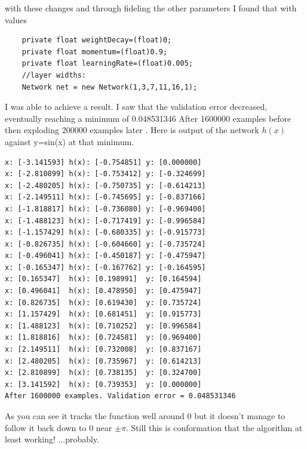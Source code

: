 \documentclass[11pt]{article} %
\begin{document}
with these changes and through fideling the other parameters I found that with values
\begin{lstlisting}
    private float weightDecay=(float)0;
    private float momentum=(float)0.9;
    private float learningRate=(float)0.005;
    //layer widths:
    Network net = new Network(1,3,7,11,16,1);
\end{lstlisting}
I was able to achieve a result. I saw that the validation error decreased, eventually reaching a minimum of 0.048531346 After 1600000 examples before then exploding 200000 examples later . Here is output of the network $h(x)$ against y=sin(x) at that minimum.
\begin{lstlisting}
x: [-3.141593] h(x): [-0.754851] y: [0.000000]
x: [-2.810899] h(x): [-0.753412] y: [-0.324699]
x: [-2.480205] h(x): [-0.750735] y: [-0.614213]
x: [-2.149511] h(x): [-0.745695] y: [-0.837166]
x: [-1.818817] h(x): [-0.736080] y: [-0.969400]
x: [-1.488123] h(x): [-0.717419] y: [-0.996584]
x: [-1.157429] h(x): [-0.680335] y: [-0.915773]
x: [-0.826735] h(x): [-0.604660] y: [-0.735724]
x: [-0.496041] h(x): [-0.450187] y: [-0.475947]
x: [-0.165347] h(x): [-0.167762] y: [-0.164595]
x: [0.165347]  h(x): [0.198991]  y: [0.164594]
x: [0.496041]  h(x): [0.478950]  y: [0.475947]
x: [0.826735]  h(x): [0.619430]  y: [0.735724]
x: [1.157429]  h(x): [0.681451]  y: [0.915773]
x: [1.488123]  h(x): [0.710252]  y: [0.996584]
x: [1.818816]  h(x): [0.724581]  y: [0.969400]
x: [2.149511]  h(x): [0.732008]  y: [0.837167]
x: [2.480205]  h(x): [0.735967]  y: [0.614213]
x: [2.810899]  h(x): [0.738135]  y: [0.324700]
x: [3.141592]  h(x): [0.739353]  y: [0.000000]
After 1600000 examples. Validation error = 0.048531346
\end{lstlisting}
As you can see it tracks the function well around 0 but it doesn't manage to follow it back down to 0 near $\pm \pi$. Still this is conformation that the algorithm at least working! ...probably.
\end{document}
